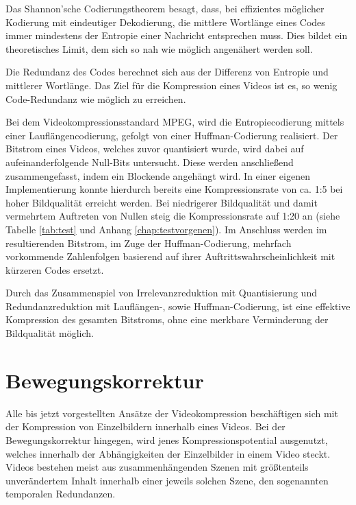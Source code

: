 Das Shannon'sche Codierungstheorem besagt, dass, bei effizientes möglicher Kodierung mit eindeutiger Dekodierung, die mittlere Wortlänge eines Codes immer mindestens der Entropie einer Nachricht entsprechen muss. Dies bildet ein theoretisches Limit, dem sich so nah wie möglich angenähert werden soll.

Die Redundanz des Codes berechnet sich aus der Differenz von Entropie und mittlerer Wortlänge. Das Ziel für die Kompression eines Videos ist es, so wenig Code-Redundanz wie möglich zu erreichen.

Bei dem Videokompressionsstandard MPEG, wird die Entropiecodierung mittels einer Lauflängencodierung, gefolgt von einer Huffman-Codierung realisiert. Der Bitstrom eines Videos, welches zuvor quantisiert wurde, wird dabei auf aufeinanderfolgende Null-Bits untersucht. Diese werden anschließend zusammengefasst, indem ein Blockende angehängt wird.
In einer eigenen Implementierung konnte hierdurch bereits eine Kompressionsrate von ca. 1:5 bei hoher Bildqualität erreicht werden. Bei niedrigerer Bildqualität und damit vermehrtem Auftreten von Nullen steig die Kompressionsrate auf 1:20 an (siehe Tabelle \ref{tab:test} und Anhang \ref{chap:testvorgenen}).
Im Anschluss werden im resultierenden Bitstrom, im Zuge der Huffman-Codierung, mehrfach vorkommende Zahlenfolgen basierend auf ihrer Auftrittswahrscheinlichkeit mit kürzeren Codes ersetzt.

Durch das Zusammenspiel von Irrelevanzreduktion mit Quantisierung und Redundanzreduktion mit Lauflängen-, sowie Huffman-Codierung, ist eine effektive Kompression des gesamten Bitstroms, ohne eine merkbare Verminderung der Bildqualität möglich.

\section{Bewegungskorrektur}
Alle bis jetzt vorgestellten Ansätze der Videokompression beschäftigen sich mit der Kompression von Einzelbildern innerhalb eines Videos. Bei der Bewegungskorrektur hingegen, wird jenes Kompressionspotential ausgenutzt, welches innerhalb der Abhängigkeiten der Einzelbilder in einem Video steckt.
Videos bestehen meist aus zusammenhängenden Szenen mit größtenteils unverändertem Inhalt innerhalb einer jeweils solchen Szene, den sogenannten temporalen Redundanzen.


